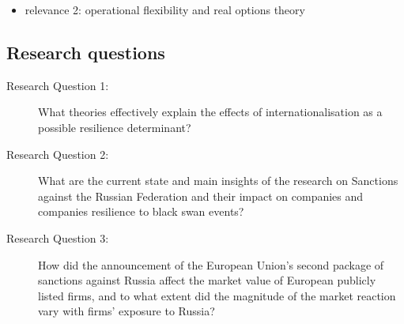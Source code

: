\documentclass[12pt,a4paper]{article}
\begin{document}
\begin{itemize}
diplomacy) (Li et al., 2022)? How can MNE subsidiaries engage with local stakeholders to minimize the impact of sanctions (Meyer \& Li, 2022)? Given the global nature of deglobalisation and sanctions, this new area of research can address Criticism 1 by demonstrating that the institution-based view is a globally relevant paradigm.
  \item relevance 2: operational flexibility and real options theory 
\end{itemize}

\subsection{Research questions}
\label{subchap:intro_question}

\begin{description}
   \item[Research Question 1:]  What theories effectively explain the effects of internationalisation as a possible resilience determinant?
\end{description}

\begin{description}
   \item[Research Question 2:]  What are the current state and main insights of the research on Sanctions against the Russian Federation and their impact on companies and companies resilience to black swan events?
\end{description}

\begin{description}
   \item[Research Question 3:]  How did the announcement of the European Union's second package of sanctions against Russia affect the market value of European publicly listed firms, and to what extent did the magnitude of the market reaction vary with firms' exposure to Russia? 
\end{description}

\end{document}
